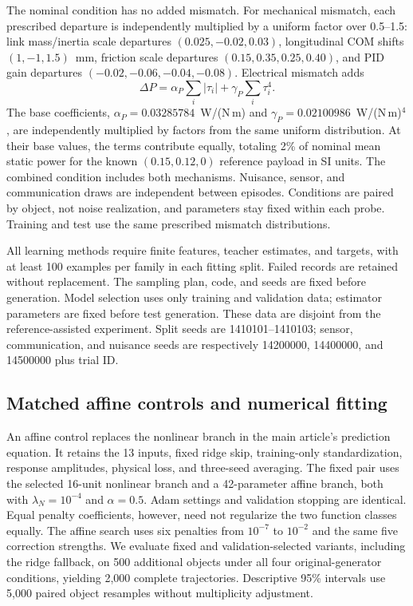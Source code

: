 \documentclass[12pt,a4paper]{article}
\begin{document}
The nominal condition has no added mismatch. For mechanical mismatch,
each prescribed departure is independently multiplied by a uniform
factor over 0.5--1.5: link mass/inertia scale departures
$(0.025,-0.02,0.03)$, longitudinal COM shifts $(1,-1,1.5)$~mm,
friction scale departures $(0.15,0.35,0.25,0.40)$, and PID gain
departures $(-0.02,-0.06,-0.04,-0.08)$. Electrical mismatch adds
\begin{equation}
 \Delta P=\alpha_P\sum_i|\tau_i|+\gamma_P\sum_i\tau_i^4.
 \label{eq:electrical_mismatch}
\end{equation}
The base coefficients, $\alpha_P=0.03285784$~W/(N\,m) and
$\gamma_P=0.02100986$~W/(N\,m)$^4$, are independently multiplied by
factors from the same uniform distribution. At their base values, the
terms contribute equally, totaling 2\% of nominal mean static power for
the known $(0.15,0.12,0)$ reference payload in SI units. The combined
condition includes both mechanisms. Nuisance, sensor, and communication
draws are independent between episodes. Conditions are paired by object,
not noise realization, and parameters stay fixed within each probe.
Training and test use the same prescribed mismatch distributions.

All learning methods require finite features, teacher estimates, and
targets, with at least 100 examples per family in each fitting split.
Failed records are retained without replacement. The sampling plan, code,
and seeds are fixed before generation. Model selection uses only training
and validation data; estimator parameters are fixed before test generation.
These data are disjoint from the reference-assisted experiment. Split
seeds are 1410101--1410103; sensor, communication, and nuisance seeds are
respectively 14200000, 14400000, and 14500000 plus trial ID.


\subsection{Matched affine controls and numerical fitting}
An affine control replaces the nonlinear branch in the main article's
prediction equation. It retains the 13 inputs, fixed ridge skip,
training-only standardization, response amplitudes, physical loss, and
three-seed averaging. The fixed pair uses the selected 16-unit nonlinear
branch and a 42-parameter affine branch, both with $\lambda_N=10^{-4}$ and
$\alpha=0.5$. Adam settings and validation stopping are identical. Equal
penalty coefficients, however, need not regularize the two function classes
equally. The affine search uses six penalties from $10^{-7}$ to $10^{-2}$
and the same five correction strengths. We evaluate fixed and
validation-selected variants, including the ridge fallback, on 500
additional objects under all four original-generator conditions, yielding
2,000 complete trajectories. Descriptive 95\% intervals use 5,000 paired
object resamples without multiplicity adjustment.
\end{document}

